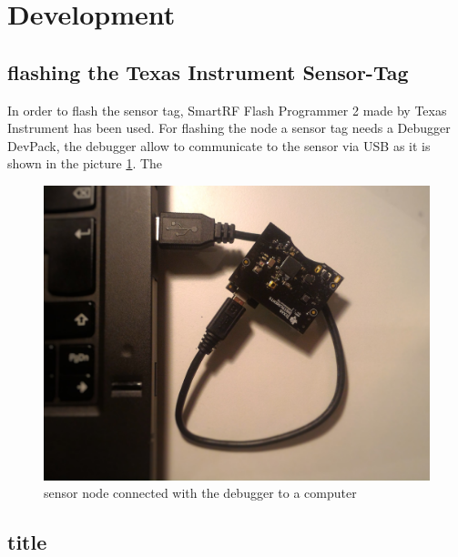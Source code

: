 \section{Development}
\subsection{flashing the Texas Instrument Sensor-Tag}
In order to flash the sensor tag, SmartRF Flash Programmer 2 made by Texas Instrument has been used. For flashing the node a sensor tag needs a Debugger DevPack, the debugger allow to communicate to the sensor via USB as it is shown in the picture \ref{fig:debugger}. The 
\begin{figure}[!h]
	\includegraphics[width=\linewidth]{debugger}
	\caption{sensor node connected with the debugger to a computer}
	\label{fig:debugger}
\end{figure} 

\subsection{title}